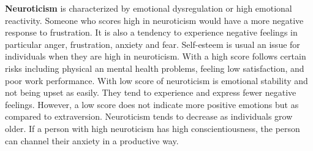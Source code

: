 \textbf{Neuroticism} is characterized by emotional dysregulation or high emotional reactivity. Someone who scores high in neuroticism would have a more negative response to frustration. It is also a tendency to experience negative feelings in particular anger, frustration, anxiety and fear. Self-esteem is usual an issue for individuals when they are high in neuroticism. With a high score follows certain risks including physical an mental health problems, feeling low satisfaction, and poor work performance. With low score of neuroticism is emotional stability and not being upset as easily. They tend to experience and express fewer negative feelings. However, a low score does not indicate more positive emotions but as compared to extraversion. Neuroticism tends to decrease as individuals grow older. If a person with high neuroticism has high conscientiousness, the person can channel their anxiety in a productive way. 






